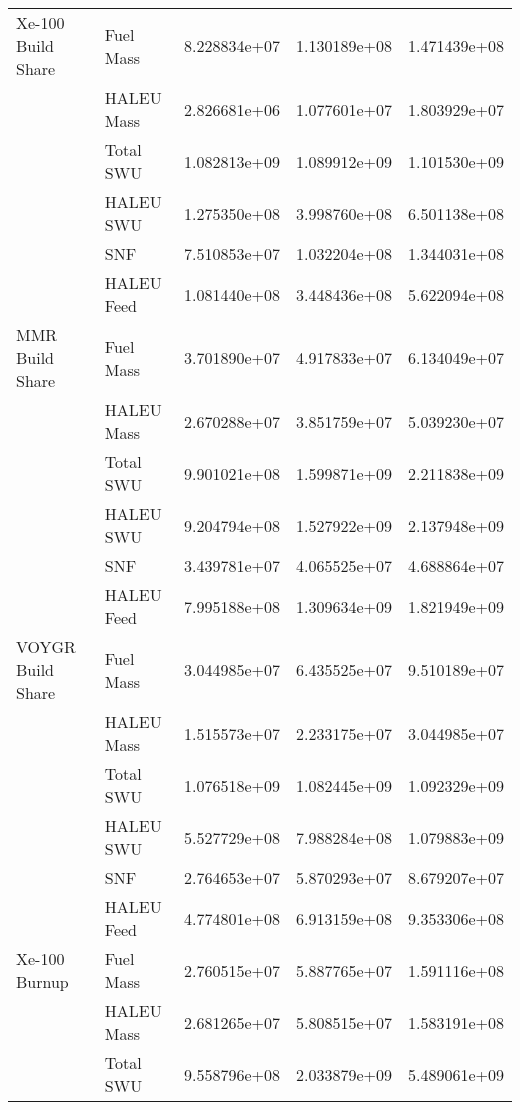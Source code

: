 \begin{table}
\begin{tabular}{llrrr}
        Xe-100 Build Share &  Fuel Mass & 8.228834e+07 & 1.130189e+08 & 1.471439e+08 \\
                           & HALEU Mass & 2.826681e+06 & 1.077601e+07 & 1.803929e+07 \\
                           &  Total SWU & 1.082813e+09 & 1.089912e+09 & 1.101530e+09 \\
                           &  HALEU SWU & 1.275350e+08 & 3.998760e+08 & 6.501138e+08 \\
                           &        SNF & 7.510853e+07 & 1.032204e+08 & 1.344031e+08 \\
                           & HALEU Feed & 1.081440e+08 & 3.448436e+08 & 5.622094e+08 \\\hline 
        MMR Build Share &  Fuel Mass & 3.701890e+07 & 4.917833e+07 & 6.134049e+07 \\
                        & HALEU Mass & 2.670288e+07 & 3.851759e+07 & 5.039230e+07 \\
                        &  Total SWU & 9.901021e+08 & 1.599871e+09 & 2.211838e+09 \\
                        &  HALEU SWU & 9.204794e+08 & 1.527922e+09 & 2.137948e+09 \\
                        &        SNF & 3.439781e+07 & 4.065525e+07 & 4.688864e+07 \\
                        & HALEU Feed & 7.995188e+08 & 1.309634e+09 & 1.821949e+09 \\\hline 
        VOYGR Build Share &  Fuel Mass & 3.044985e+07 & 6.435525e+07 & 9.510189e+07 \\
                          & HALEU Mass & 1.515573e+07 & 2.233175e+07 & 3.044985e+07 \\
                          &  Total SWU & 1.076518e+09 & 1.082445e+09 & 1.092329e+09 \\
                          &  HALEU SWU & 5.527729e+08 & 7.988284e+08 & 1.079883e+09 \\
                          &        SNF & 2.764653e+07 & 5.870293e+07 & 8.679207e+07 \\
                          & HALEU Feed & 4.774801e+08 & 6.913159e+08 & 9.353306e+08 \\\hline 
        Xe-100 Burnup &  Fuel Mass & 2.760515e+07 & 5.887765e+07 & 1.591116e+08 \\
                      & HALEU Mass & 2.681265e+07 & 5.808515e+07 & 1.583191e+08 \\
                      &  Total SWU & 9.558796e+08 & 2.033879e+09 & 5.489061e+09 \\

\end{tabular}
\end{table}
